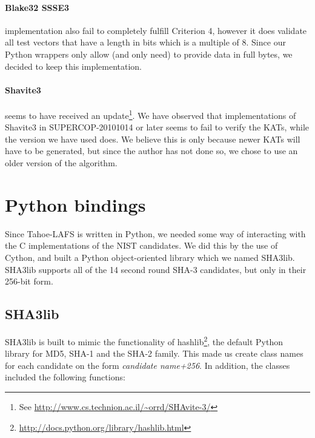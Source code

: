 \documentclass[english,12pt,a4paper]{book}
\begin{document}
\paragraph{Blake32 \ac{SSSE3}} implementation also fail to completely fulfill
Criterion 4, however it does validate all test vectors that have a length
in bits which is a multiple of 8. Since our Python wrappers only allow (and
only need) to provide data in full bytes, we decided to keep this
implementation.

\paragraph{Shavite3} seems to have received an update\footnote{See
\url{http://www.cs.technion.ac.il/~orrd/SHAvite-3/}}. We have observed that
implementations of Shavite3 in \ac{SUPERCOP}-20101014 or later seems to fail to
verify the \ac{KAT}s, while the version we have used does. We believe this is
only because newer \ac{KAT}s will have to be generated, but since the author
has not done so, we chose to use an older version of the algorithm.

\section{Python bindings}

Since Tahoe-\ac{LAFS} is written in Python, we needed some way of interacting
with the C implementations of the NIST candidates. We did this by the use of
Cython, and built a Python object-oriented library which we named SHA3lib.
SHA3lib supports all of the 14 second round \ac{SHA}-3 candidates, but only in
their 256-bit form.

\subsection{SHA3lib}
SHA3lib is built to mimic the functionality of
hashlib\footnote{\url{http://docs.python.org/library/hashlib.html}}, the
default Python library for MD5, \ac{SHA}-1 and the \ac{SHA}-2 family. This
made us create class names for each candidate on the form
\emph{candidate name+256}. In addition, the classes included the following
functions:

\end{document}
